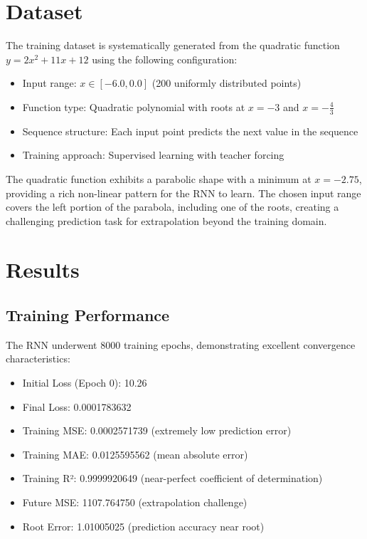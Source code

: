 \documentclass[11pt,a4paper]{article}
\begin{document}
\section{Dataset}

The training dataset is systematically generated from the quadratic function $y = 2x^2 + 11x + 12$ using the following configuration:
\begin{itemize}
\item Input range: $x \in [-6.0, 0.0]$ (200 uniformly distributed points)
\item Function type: Quadratic polynomial with roots at $x = -3$ and $x = -\frac{4}{3}$
\item Sequence structure: Each input point predicts the next value in the sequence
\item Training approach: Supervised learning with teacher forcing
\end{itemize}

The quadratic function exhibits a parabolic shape with a minimum at $x = -2.75$, providing a rich non-linear pattern for the RNN to learn. The chosen input range covers the left portion of the parabola, including one of the roots, creating a challenging prediction task for extrapolation beyond the training domain.

\section{Results}

\subsection{Training Performance}

The RNN underwent 8000 training epochs, demonstrating excellent convergence characteristics:
\begin{itemize}
\item Initial Loss (Epoch 0): 10.26
\item Final Loss: 0.0001783632
\item Training MSE: 0.0002571739 (extremely low prediction error)
\item Training MAE: 0.0125595562 (mean absolute error)
\item Training R²: 0.9999920649 (near-perfect coefficient of determination)
\item Future MSE: 1107.764750 (extrapolation challenge)
\item Root Error: 1.01005025 (prediction accuracy near root)
\end{itemize}
\end{document}
